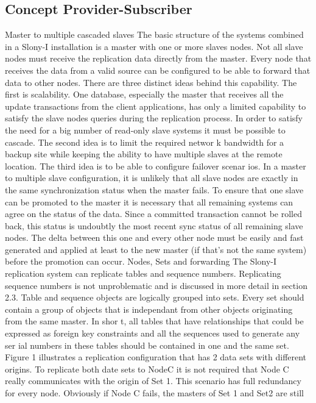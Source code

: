 \subsection{Concept Provider-Subscriber}
Master to multiple cascaded slaves
The basic structure of the systems combined in a Slony-I installation is a
master with one or more slaves nodes. Not all slave nodes must receive the replication
data directly from the master. Every node that receives the data from a
valid source can be configured to be able to forward that data to other nodes.
There are three distinct ideas behind this capability. The first is scalability.
One database, especially the master that receives all the update transactions
from the client applications, has only a limited capability to satisfy the slave
nodes queries during the replication process. In order to satisfy the need for a big
number of read-only slave systems it must be possible to cascade.
The second idea is to limit the required networ k bandwidth for a backup site
while keeping the ability to have multiple slaves at the remote location.
The third idea is to be able to configure failover scenar ios. In a master to
multiple slave configuration, it is unlikely that all slave nodes are exactly in the
same synchronization status when the master fails. To ensure that one slave can
be promoted to the master it is necessary that all remaining systems can agree
on the status of the data. Since a committed transaction cannot be rolled back,
this status is undoubtly the most recent sync status of all remaining slave nodes.
The delta between this one and every other node must be easily and fast generated
and applied at least to the new master (if that’s not the same system) before
the promotion can occur.
Nodes, Sets and forwarding
The Slony-I replication system can replicate tables and sequence numbers.
Replicating sequence numbers is not unproblematic and is discussed in more
detail in section 2.3.
Table and sequence objects are logically grouped into sets. Every set
should contain a group of objects that is independant from other objects originating
from the same master. In shor t, all tables that have relationships that could
be expressed as foreign key constraints and all the sequences used to generate
any ser ial numbers in these tables should be contained in one and the same set.
Figure 1 illustrates a replication configuration that has 2 data sets with different
origins. To replicate both date sets to NodeC it is not required that Node C
really communicates with the origin of Set 1. This scenario has full redundancy
for every node. Obviously if Node C fails, the masters of Set 1 and Set2 are still
